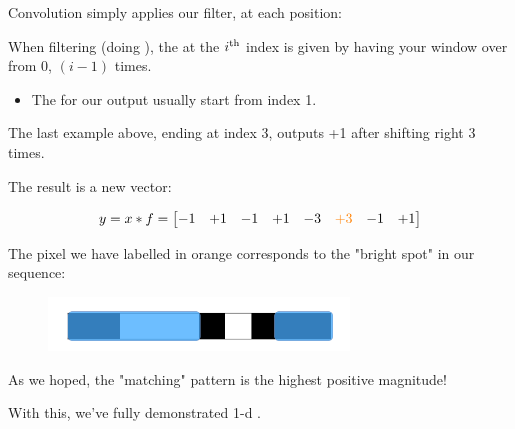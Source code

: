         Convolution simply applies our filter, at each position:\\

        \begin{concept}
            When filtering (doing ), the  at the $i^{ \text{th} }$ index is given by having  your window over from 0, $(i-1)$ times.

            \begin{itemize}
                \item The  for our output usually start from index 1.
            \end{itemize}
        \end{concept}

        \miniex The last example above, ending at index 3, outputs +1 after shifting right 3 times.

        The result is a new vector:

        \begin{equation}
            y=x \ast f = 
            \begin{bmatrix}
                -1 & +1 & -1 & +1 & -3 & \textcolor{orange}{+3} & -1 & +1
            \end{bmatrix}
        \end{equation}

        The pixel we have labelled in orange corresponds to the "bright spot" in our sequence:

        \begin{figure}[H]
            \centering
            \includegraphics[width=80mm,scale=0.5]{images/convolutional_neural_networks_images/bright_spot_window.png}
        \end{figure}

        As we hoped, the "matching" pattern is the highest positive magnitude!

        With this, we've fully demonstrated 1-d .\\

